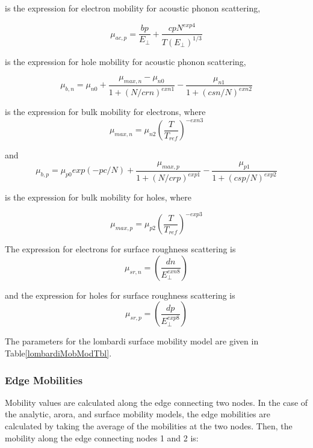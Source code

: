 is the expression for electron mobility for acoustic phonon scattering,

\begin{equation}
  \mu_{ac,p} = \frac{bp}{E_{\perp}} + \frac{cp N^{exp4}}{T
  (E_{\perp})^{1/3}}
\end{equation}

is the expression for hole mobility for acoustic phonon scattering,

\begin{equation}
 \mu_{b,n} = \mu_{n0} + \frac{\mu_{max,n}-\mu_{n0}}{1+(N/crn)^{exn1}} -
 \frac{\mu_{n1}}{1+(csn/N)^{exn2}}
\end{equation}

is the expression for bulk mobility for electrons, where
\begin{equation}
 \mu_{max,n} = \mu_{n2}(\frac{T}{T_{ref}})^{-exn3}
\end{equation}

and 
\begin{equation}
  \mu_{b,p} = \mu_{p0}exp(-pc/N) + \frac{\mu_{max,p}}{1+(N/crp)^{exp1}} -
  \frac{\mu_{p1}}{1 + (csp/N)^{exp2}}
\end{equation}

is the expression for bulk mobility for holes, where

\begin{equation}
  \mu_{max,p} = \mu_{p2}(\frac{T}{T_{ref}})^{-exp3}
\end{equation}

The expression for electrons for surface roughness scattering is
\begin{equation}
  \mu_{sr,n} = (\frac{dn}{E_{\perp}^{exn8}})
\end{equation}

and the expression for holes for surface roughness scattering is
\begin{equation}
  \mu_{sr,p} = (\frac{dp}{E_{\perp}^{exp8}})
\end{equation}

The parameters for the lombardi surface mobility model are given in Table\ref{lombardiMobModTbl}.
\newpage
{}

\subsubsection{Edge Mobilities}
Mobility values are calculated along the edge connecting two nodes.  In the
case of the analytic, arora, and surface mobility models, the edge
mobilities are calculated by taking the average of the mobilities at the
two nodes.  Then, the mobility along the edge connecting nodes 1 and 2 is:

